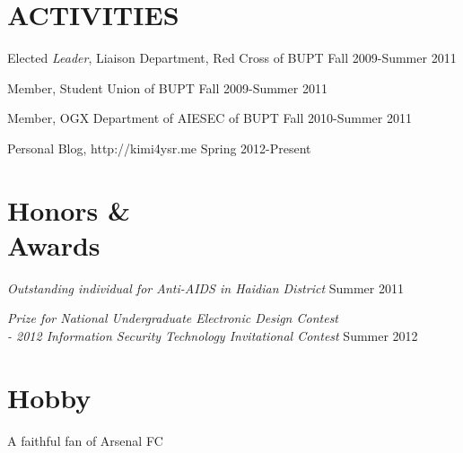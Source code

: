 \documentclass[margin]{res}
\begin{document}
\begin{resume}
\section{ACTIVITIES}             
        Elected {\it Leader}, Liaison Department, Red Cross of BUPT 
        \hfill Fall 2009-Summer 2011
        
        Member, Student Union of BUPT
        \hfill Fall 2009-Summer 2011 
        
        Member, OGX Department of AIESEC of BUPT
        \hfill Fall 2010-Summer 2011
        
        Personal Blog, http://kimi4ysr.me
        \hfill Spring 2012-Present
                
\section{Honors \& \\ Awards}
        {\sl Outstanding individual for Anti-AIDS in Haidian District}
        \hfill Summer 2011
        
        {\sl Prize for National Undergraduate Electronic Design Contest \\- 2012 Information Security Technology Invitational Contest}
        \hfill Summer 2012
        
\section{Hobby} A faithful fan of Arsenal FC 

\end{resume}
\end{document}
